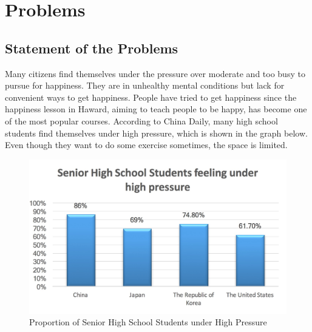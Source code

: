 \section{Problems}

\subsection{Statement of the Problems}

Many citizens find themselves under the pressure over moderate and too busy to pursue for happiness. They are in unhealthy mental conditions but lack for convenient ways to get happiness. People have tried to get happiness since the happiness lesson in Haward, aiming to teach people to be happy, has become one of the most popular courses. According to China Daily, many high school students find themselves under high pressure, which is shown in the graph below. Even though they want to do some exercise sometimes, the space is limited.
\begin{figure}
    \centering
    \includegraphics[width=13cm]{Pics/Problems1}
    \caption{Proportion of Senior High School Students under High Pressure}
    \label{scalerStep}
\end{figure}

